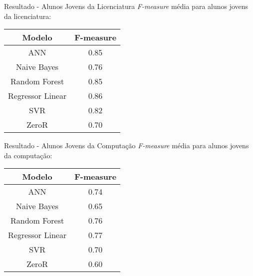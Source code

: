 \begin{frame}{Resultado - Alunos Jovens da Licenciatura}
    \textit{F-measure} média para alunos jovens da licenciatura: 
    \begin{table}
    \begin{center}
    \begin{tabular}[c]{| c | c |}
        \hline
        \textbf{Modelo} & \textbf{F-measure} \\
        \hline
        ANN              & 0.85 \\
        \hline
        Naive Bayes      & 0.76 \\
        \hline
        Random Forest    & 0.85 \\
        \hline
        Regressor Linear & 0.86 \\
        \hline
        SVR              & 0.82 \\
        \hline
        ZeroR            & 0.70 \\
        \hline
    \end{tabular}
    \end{center}
    \end{table}
\end{frame}

\begin{frame}{Resultado - Alunos Jovens da Computação}
    \textit{F-measure} média para alunos jovens da computação: 
    \begin{table}
    \begin{center}
    \begin{tabular}[c]{| c | c |}
        \hline
        \textbf{Modelo} & \textbf{F-measure} \\
        \hline
        ANN              & 0.74 \\
        \hline
        Naive Bayes      & 0.65 \\
        \hline
        Random Forest    & 0.76 \\
        \hline
        Regressor Linear & 0.77 \\
        \hline
        SVR              & 0.70 \\
        \hline
        ZeroR            & 0.60 \\
        \hline
    \end{tabular}
    \end{center}
    \end{table}
\end{frame}

